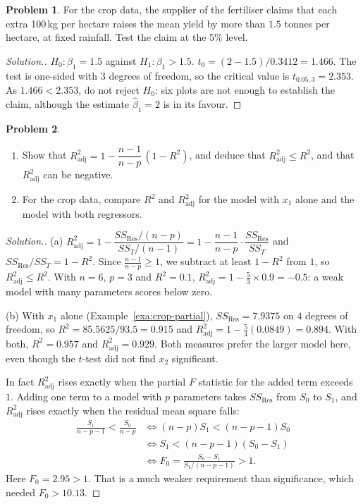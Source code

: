 \documentclass[11pt,a4paper]{article}
\numberwithin{equation}{section}
\theoremstyle{definition}
\newtheorem{problemx}{Problem}[subsection]
\newenvironment{problem}{\begin{problemx}}{\end{problemx}}
\newenvironment{solution}
  {\renewcommand{\qedsymbol}{}\begin{proof}[\textit{Solution}.]}
  {\end{proof}}
\begin{document}
\begin{problem}
For the crop data, the supplier of the fertiliser claims that each extra 100\,kg per hectare
raises the mean yield by more than $1.5$ tonnes per hectare, at fixed rainfall. Test the claim
at the 5\% level.
\end{problem}

\begin{solution}
$H_0\colon \beta_1 = 1.5$ against $H_1\colon \beta_1 > 1.5$.
$t_0 = (2 - 1.5)/0.3412 = 1.466$. The test is one-sided with $3$ degrees of freedom, so the
critical value is $t_{0.05,3} = 2.353$. As $1.466 < 2.353$, do not reject $H_0$: six plots are
not enough to establish the claim, although the estimate $\hat\beta_1 = 2$ is in its favour.
\end{solution}

\begin{problem}
\begin{enumerate}[label=(\alph*)]
\item Show that $R^2_{\mathrm{adj}} = 1 - \dfrac{n-1}{n-p}\,(1 - R^2)$, and deduce that
$R^2_{\mathrm{adj}} \le R^2$, and that $R^2_{\mathrm{adj}}$ can be negative.
\item For the crop data, compare $R^2$ and $R^2_{\mathrm{adj}}$ for the model with $x_1$ alone
and the model with both regressors.
\end{enumerate}
\end{problem}

\begin{solution}
(a) $R^2_{\mathrm{adj}} = 1 - \dfrac{SS_{\mathrm{Res}}/(n-p)}{SS_T/(n-1)} = 1 - \dfrac{n-1}{n-p}\cdot\dfrac{SS_{\mathrm{Res}}}{SS_T}$
and $SS_{\mathrm{Res}}/SS_T = 1 - R^2$. Since $\frac{n-1}{n-p} \ge 1$, we subtract at least
$1 - R^2$ from $1$, so $R^2_{\mathrm{adj}} \le R^2$. With $n = 6$, $p = 3$ and $R^2 = 0.1$,
$R^2_{\mathrm{adj}} = 1 - \frac53 \times 0.9 = -0.5$: a weak model with many parameters scores
below zero.

(b) With $x_1$ alone (Example~\ref{exa:crop-partial}), $SS_{\mathrm{Res}} = 7.9375$ on $4$
degrees of freedom, so $R^2 = 85.5625/93.5 = 0.915$ and
$R^2_{\mathrm{adj}} = 1 - \frac54(0.0849) = 0.894$. With both,
$R^2 = 0.957$ and $R^2_{\mathrm{adj}} = 0.929$. Both measures prefer the larger model here,
even though the $t$-test did not find $x_2$ significant.

In fact $R^2_{\mathrm{adj}}$ rises exactly when the partial $F$ statistic for the added term
exceeds $1$. Adding one term to a model with $p$ parameters takes $SS_{\mathrm{Res}}$ from
$S_0$ to $S_1$, and $R^2_{\mathrm{adj}}$ rises exactly when the residual mean square falls:
\begin{align*}
\frac{S_1}{n-p-1} < \frac{S_0}{n-p}
&\iff (n-p)S_1 < (n-p-1)S_0 \\
&\iff S_1 < (n-p-1)(S_0 - S_1) \\
&\iff F_0 = \frac{S_0 - S_1}{S_1/(n-p-1)} > 1 .
\end{align*}
Here $F_0 = 2.95 > 1$. That is a much weaker requirement than significance, which needed
$F_0 > 10.13$.
\end{solution}
\end{document}
